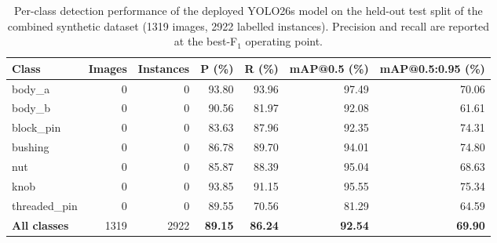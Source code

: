 \begin{table}[htbp]
\centering
\caption{Per-class detection performance of the deployed YOLO26s model on the held-out test split of the combined synthetic dataset (1319 images, 2922 labelled instances). Precision and recall are reported at the best-F$_1$ operating point.}
\label{tab:detector_perclass}
\begin{tabular}{lrrrrrr}
\hline
Class & Images & Instances & P (\%) & R (\%) & mAP@0.5 (\%) & mAP@0.5:0.95 (\%) \\
\hline
body\_a & 0 & 0 & 93.80 & 93.96 & 97.49 & 70.06 \\
body\_b & 0 & 0 & 90.56 & 81.97 & 92.08 & 61.61 \\
block\_pin & 0 & 0 & 83.63 & 87.96 & 92.35 & 74.31 \\
bushing & 0 & 0 & 86.78 & 89.70 & 94.01 & 74.80 \\
nut & 0 & 0 & 85.87 & 88.39 & 95.04 & 68.63 \\
knob & 0 & 0 & 93.85 & 91.15 & 95.55 & 75.34 \\
threaded\_pin & 0 & 0 & 89.55 & 70.56 & 81.29 & 64.59 \\
\hline
\textbf{All classes} & 1319 & 2922 & \textbf{89.15} & \textbf{86.24} & \textbf{92.54} & \textbf{69.90} \\
\hline
\end{tabular}
\end{table}
